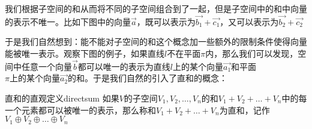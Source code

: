     我们根据子空间的和从而将不同的子空间组合到了一起，但是子空间中的和中向量的表示不唯一。比如下图中的向量$\Vec{a}$，既可以表示为$\Vec{b_1}+\Vec{c_1}$，又可以表示为$\Vec{b_2}+\Vec{c_2}$
    
    于是我们自然想到：能不能对子空间的和这个概念加一些额外的限制条件使得向量能被唯一表示。观察下图的例子，如果直线$l$不在平面$\pi$内，那么我们可以发现，空间中任意一个向量$\Vec{b}$都可以唯一的表示为直线$l\textrm{上的某个向量}\Vec{a_1}$和平面$\pi\textrm{上的某个向量}\Vec{a_2}$的和。于是我们自然的引入了直和的概念：
    \begin{definition}{直和的直观定义}{directsum}
        如果$V$的子空间$V_1,V_2,\dots,V_n$的和$V_1+V_2+\dots+V_n$中的每一个元素都可以被唯一的表示，那么称和$V_1+V_2+\dots+V_n$为直和，记作$V_1\oplus V_2\oplus\dots\oplus V_n$
    \end{definition}

